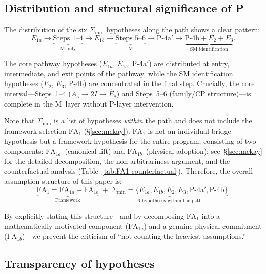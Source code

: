 \documentclass[sn-mathphys-num,Numbered]{sn-jnl}
\theoremstyle{thmstyleone}
\theoremstyle{thmstylethree}
\newcommand{\Amin}{\Sigma_{\min}}
\newcommand{\Ehat}{\hat{E}}
\begin{document}
\subsection{Distribution and structural significance of P}\label{sec:distribution}

The distribution of the six $\Amin$ hypotheses along the path shows a clear
pattern:
\begin{equation}\label{eq:distribution}
  E_{1a} \longrightarrow
  \underbrace{\text{Steps 1--4}}_{\text{M only}} \longrightarrow
  E_{1b} \longrightarrow
  \underbrace{\text{Steps 5--6}}_{\text{M}} \longrightarrow
  \text{P-4a}' \longrightarrow
  \underbrace{\text{P-4b} + E_2 + E_3}_{\text{SM identification}}.
\end{equation}

The core pathway hypotheses ($E_{1a}$, $E_{1b}$, P-4a$'$) are distributed at
entry, intermediate, and exit points of the pathway, while the SM
identification hypotheses ($E_2$, $E_3$, P-4b) are concentrated in the final
step.  Crucially, the core interval---Steps~1--4 ($A_5 \to 2I \to \Ehat_8$)
and Steps~5--6 (family/CP structure)---is complete in the M~layer without
P-layer intervention.

Note that $\Amin$ is a list of hypotheses \emph{within} the path and does not
include the framework selection $\mathrm{FA}_1$ (\S\ref{sec:mckay}).
$\mathrm{FA}_1$ is not an individual bridge hypothesis but a framework
hypothesis for the entire program, consisting of two components:
$\mathrm{FA}_{1a}$~(canonical lift) and $\mathrm{FA}_{1b}$~(physical
adoption); see~\S\ref{sec:mckay} for the detailed decomposition, the
non-arbitrariness argument, and the counterfactual analysis
(Table~\ref{tab:FA1-counterfactual}).
Therefore, the overall assumption structure of this paper is:
\begin{equation}\label{eq:total-structure}
  \underbrace{\mathrm{FA}_1
    = \mathrm{FA}_{1a} + \mathrm{FA}_{1b}}_{\text{Framework}}
  \;+\;
  \underbrace{\Amin = \{E_{1a}, E_{1b}, E_2, E_3,
    \text{P-4a}', \text{P-4b}\}}_{\text{6 hypotheses within the path}}.
\end{equation}

By explicitly stating this structure---and by decomposing $\mathrm{FA}_1$
into a mathematically motivated component ($\mathrm{FA}_{1a}$) and a genuine
physical commitment ($\mathrm{FA}_{1b}$)---we prevent the criticism of ``not
counting the heaviest assumptions.''


\subsection{Transparency of hypotheses}\label{sec:transparency}
\end{document}
